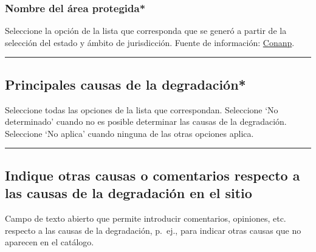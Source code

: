 \documentclass[
]{book}
\begin{document}
\hypertarget{nombre-del-uxe1rea-protegida}{%
\subsubsection*{\texorpdfstring{{Nombre del área protegida*}}{Nombre del área protegida*}}\label{nombre-del-uxe1rea-protegida}}

Seleccione la opción de la lista que corresponda que se generó a partir de la selección del estado y ámbito de jurisdicción. Fuente de información: \href{http://sig.conanp.gob.mx/website/pagsig/listanp/}{Conanp}.

\begin{center}\rule{0.5\linewidth}{0.5pt}\end{center}

\hypertarget{principales-causas-de-la-degradaciuxf3n}{%
\subsection*{\texorpdfstring{{Principales causas de la degradación*}}{Principales causas de la degradación*}}\label{principales-causas-de-la-degradaciuxf3n}}

Seleccione todas las opciones de la lista que correspondan.
Seleccione `No determinado' cuando no es posible determinar las causas de la degradación.
Seleccione `No aplica' cuando ninguna de las otras opciones aplica.

\begin{center}\rule{0.5\linewidth}{0.5pt}\end{center}

\hypertarget{indique-otras-causas-o-comentarios-respecto-a-las-causas-de-la-degradaciuxf3n-en-el-sitio}{%
\subsection*{Indique otras causas o comentarios respecto a las causas de la degradación en el sitio}\label{indique-otras-causas-o-comentarios-respecto-a-las-causas-de-la-degradaciuxf3n-en-el-sitio}}

Campo de texto abierto que permite introducir comentarios, opiniones, etc. respecto a las causas de la degradación, p.~ej., para indicar otras causas que no aparecen en el catálogo.
\end{document}
